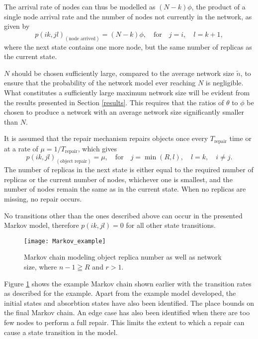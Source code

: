 The arrival rate of nodes can thus be modelled as $(N - k)\phi$, the product of a single node arrival rate and the number of nodes not currently in the network, as given by
%
\begin{equation} \label{eq_node_arrived}
    p(i k,j l)_{(\textrm{node arrived})} = (N - k)\phi,\quad\textrm{for}\quad j = i,\quad l = k + 1,
\end{equation}
%
where the next state contains one more node, but the same number of replicas as the current state.


$N$ should be chosen sufficiently large, compared to the average network size $\tilde{n}$, to ensure that the probability of the network model ever reaching $N$ is negligible. What constitutes a sufficiently large maximum network size will be evident from the results presented in Section \ref{results}. This requires that the ratios of $\theta$ to $\phi$ be chosen to produce a network with an average network size significantly smaller than $N$.

It is assumed that the repair mechanism repairs objects once every $T_{\textrm{repair}}$ time or at a rate of $\mu = 1/T_{\textrm{repair}}$, which gives
%
\begin{equation} \label{eq_repair}
    p(i k,j l)_{(\textrm{object repair})} = \mu,\quad\textrm{for}\quad j = \min(R, l),\quad l = k,\quad i \neq j.
\end{equation}
%
The number of replicas in the next state is either equal to the required number of replicas or the current number of nodes, whichever one is smallest, and the number of nodes remain the same as in the current state. When no replicas are missing, no repair occurs.

No transitions other than the ones described above can occur in the presented Markov model, therefore $p(i k,j l) = 0$ for all other state transitions.

\begin{figure}[htbp]
 \centering
 \texttt{[image: Markov\_example]}
 \caption{Markov chain modeling object replica number as well as network size, where $n-1\geqq R$ and $r > 1$.}
 \label{fig_markov_example}
\end{figure}
%
Figure \ref{fig_markov_example} shows the example Markov chain shown earlier with the transition rates as described for the example. Apart from the example model developed, the initial states and absorbtion states have also been identified. The place bounds on the final Markov chain. An edge case has also been identified when there are too few nodes to perform a full repair. This limits the extent to which a repair can cause a state transition in the model.

